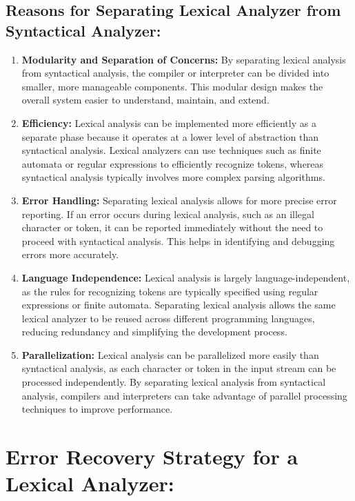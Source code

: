 \documentclass{article}
\begin{document}
\subsection{Reasons for Separating Lexical Analyzer from Syntactical Analyzer:}
\begin{enumerate}
    \item \textbf{Modularity and Separation of Concerns:} By separating lexical analysis from syntactical analysis, the compiler or interpreter can be divided into smaller, more manageable components. This modular design makes the overall system easier to understand, maintain, and extend.
    
    \item \textbf{Efficiency:} Lexical analysis can be implemented more efficiently as a separate phase because it operates at a lower level of abstraction than syntactical analysis. Lexical analyzers can use techniques such as finite automata or regular expressions to efficiently recognize tokens, whereas syntactical analysis typically involves more complex parsing algorithms.
    
    \item \textbf{Error Handling:} Separating lexical analysis allows for more precise error reporting. If an error occurs during lexical analysis, such as an illegal character or token, it can be reported immediately without the need to proceed with syntactical analysis. This helps in identifying and debugging errors more accurately.
    
    \item \textbf{Language Independence:} Lexical analysis is largely language-independent, as the rules for recognizing tokens are typically specified using regular expressions or finite automata. Separating lexical analysis allows the same lexical analyzer to be reused across different programming languages, reducing redundancy and simplifying the development process.
    
    \item \textbf{Parallelization:} Lexical analysis can be parallelized more easily than syntactical analysis, as each character or token in the input stream can be processed independently. By separating lexical analysis from syntactical analysis, compilers and interpreters can take advantage of parallel processing techniques to improve performance.
\end{enumerate}
\section{Error Recovery Strategy for a Lexical Analyzer:}
\end{document}
